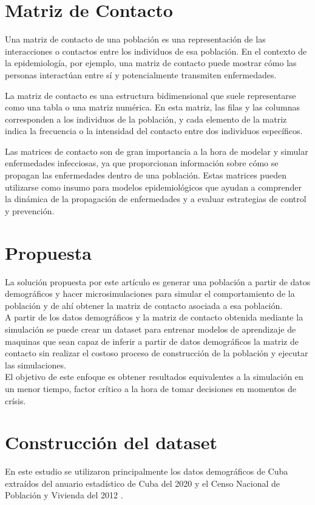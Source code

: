 \documentclass{article}
\begin{document}
\section{Matriz de Contacto}
Una matriz de contacto de una población es una representación de las interacciones o contactos entre los individuos de esa población. En el contexto de la epidemiología, por ejemplo, una matriz de contacto puede mostrar cómo las personas interactúan entre sí y potencialmente transmiten enfermedades.

La matriz de contacto es una estructura bidimensional que suele representarse como una tabla o una matriz numérica. En esta matriz, las filas y las columnas corresponden a los individuos de la población, y cada elemento de la matriz indica la frecuencia o la intensidad del contacto entre dos individuos específicos.

Las matrices de contacto son de gran importancia a la hora de modelar y simular enfermedades infecciosas, ya que proporcionan información sobre cómo se propagan las enfermedades dentro de una población. Estas matrices pueden utilizarse como insumo para modelos epidemiológicos que ayudan a comprender la dinámica de la propagación de enfermedades y a evaluar estrategias de control y prevención.

\section{Propuesta}
La solución propuesta por este artículo es generar una población a partir de datos demográficos y hacer microsimulaciones para simular el comportamiento de la población y de ahí obtener la matriz de contacto asociada a esa población.\\
A partir de los datos demográficos y la matriz de contacto obtenida mediante la simulación se puede crear un dataset para entrenar modelos de aprendizaje de maquinas que sean capaz de inferir a partir de datos demográficos la matriz de contacto sin realizar el costoso proceso de construcción de la población y ejecutar las simulaciones.\\ 
El objetivo de este enfoque es obtener resultados equivalentes a la simulación en un menor tiempo, factor crítico a la hora de tomar decisiones en momentos de crísis.

\section{Construcci\'on del dataset}
En este estudio se utilizaron principalmente los datos demográficos de Cuba extraídos del anuario estadístico de Cuba del 2020\cite{anuario} y el Censo Nacional de Población y Vivienda del 2012 \cite{censo}.
\end{document}
